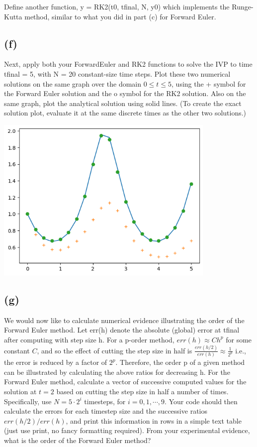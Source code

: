 \documentclass[11pt]{article}
\begin{document}
Define another function, y = RK2(t0, tfinal, N, y0) which implements the Runge-Kutta method, similar to what you did in part (c) for Forward Euler.

\subsection{(f)}

Next, apply both your ForwardEuler and RK2 functions to solve the IVP to time tfinal = 5, with N = 20 constant-size time steps. Plot these two numerical solutions on the same graph over the domain $0 \leq t \leq 5$, using the + symbol for the Forward Euler solution and the o symbol for the RK2 solution. Also on the same graph, plot the analytical solution using solid lines. (To create the exact solution plot, evaluate it at the same discrete times as the other two solutions.)

\includegraphics[width=300pt]{a2q1_2.png}


\subsection{(g)}

We would now like to calculate numerical evidence illustrating the order of the Forward Euler method. Let err(h) denote the absolute (global) error at tfinal after computing with step size h. For a p-order method, $err(h) \approx Ch^p$ for some constant $C$, and so the effect of cutting the step size in half is $\frac{err(h/2)}{err(h)} \approx \frac{1}{2^p}$ i.e., the error is reduced by a factor of $2^p$. Therefore, the order p of a given method can be illustrated by calculating the above ratios for decreasing h. For the Forward Euler method, calculate a vector of successive computed values for the solution at $t = 2$ based on cutting the step size in half a number of times. Specifically, use $N = 5 \cdot 2^i$ timesteps, for $i = 0, 1, \cdots, 9$. Your code should then calculate the errors for each timestep size and the successive ratios $err(h/2) / err(h)$, and print this information in rows in a simple text table (just use print, no fancy formatting required). From your experimental evidence, what is the order of the Forward Euler method?
\end{document}
